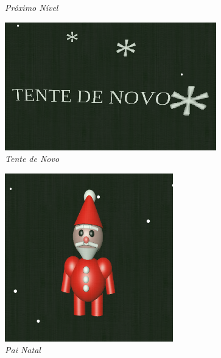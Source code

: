 \documentclass[a4paper,12pt]{article}
\begin{document}
\begin{figure}[h!]
\begin{minipage}{.5\textwidth}
  \caption{\emph{Próximo Nível}} \label{Fig:proximoNivel}
\end{minipage}%
\begin{minipage}{.5\textwidth}
  \centering
  \includegraphics[scale=0.4]{./imagens/tenteDeNovo.png}
  \caption{\emph{Tente de Novo}} \label{Fig:tenteDeNovo}
\end{minipage}
\end{figure}

\begin{figure}[h!]
\centering
\includegraphics[scale=0.6]{./imagens/PaiNatal.png}
\caption{\emph{Pai Natal}} \label{Fig:Pai Natal}
\end{figure}
\end{document}
